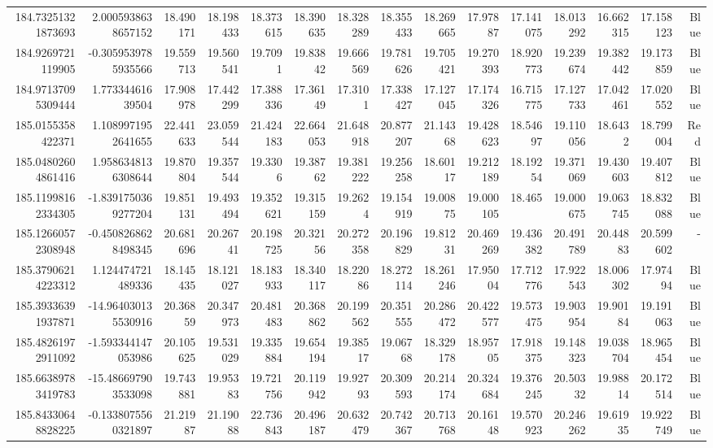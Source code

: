 \begin{center}
\begin{longtable}{rrrrrrrrrrrrrrr}
184.73251321873693 & 2.0005938638657152 & 18.490171 & 18.198433 & 18.373615 & 18.390635 & 18.328289 & 18.355433 & 18.269665 & 17.97887 & 17.141075 & 18.013292 & 16.662315 & 17.158123 & Blue \\
184.9269721119905 & -0.3059539785935566 & 19.559713 & 19.560541 & 19.7091 & 19.83842 & 19.666569 & 19.781626 & 19.705421 & 19.270393 & 18.920773 & 19.239674 & 19.382442 & 19.173859 & Blue \\
184.97137095309444 & 1.77334461639504 & 17.908978 & 17.442299 & 17.388336 & 17.36149 & 17.3101 & 17.338427 & 17.127045 & 17.174326 & 16.715775 & 17.127733 & 17.042461 & 17.020552 & Blue \\
185.0155358422371 & 1.1089971952641655 & 22.441633 & 23.059544 & 21.424183 & 22.664053 & 21.648918 & 20.877207 & 21.14368 & 19.428623 & 18.54697 & 19.110056 & 18.6432 & 18.799004 & Red \\
185.04802604861416 & 1.9586348136308644 & 19.870804 & 19.357544 & 19.3306 & 19.38762 & 19.381222 & 19.256258 & 18.60117 & 19.212189 & 18.19254 & 19.371069 & 19.430603 & 19.407812 & Blue \\
185.11998162334305 & -1.8391750369277204 & 19.851131 & 19.493494 & 19.352621 & 19.315159 & 19.2624 & 19.154919 & 19.00875 & 19.000105 & 18.465 & 19.000675 & 19.063745 & 18.832088 & Blue \\
185.12660572308948 & -0.4508268628498345 & 20.681696 & 20.26741 & 20.198725 & 20.32156 & 20.272358 & 20.196829 & 19.81231 & 20.469269 & 19.436382 & 20.491789 & 20.44883 & 20.599602 & - \\
185.37906214223312 & 1.124474721489336 & 18.145435 & 18.121027 & 18.183933 & 18.340117 & 18.22086 & 18.272114 & 18.261246 & 17.95004 & 17.712776 & 17.922543 & 18.006302 & 17.97494 & Blue \\
185.39336391937871 & -14.964030135530916 & 20.36859 & 20.347973 & 20.481483 & 20.368862 & 20.199562 & 20.351555 & 20.286472 & 20.422577 & 19.573475 & 19.903954 & 19.90184 & 19.191063 & Blue \\
185.48261972911092 & -1.593344147053986 & 20.105625 & 19.531029 & 19.335884 & 19.654194 & 19.38517 & 19.06768 & 18.329178 & 18.95705 & 17.918375 & 19.148323 & 19.038704 & 18.965454 & Blue \\
185.66389783419783 & -15.486697903533098 & 19.743881 & 19.95383 & 19.721756 & 20.119942 & 19.92793 & 20.309593 & 20.214174 & 20.324684 & 19.376245 & 20.50332 & 19.98814 & 20.172514 & Blue \\
185.84330648828225 & -0.1338075560321897 & 21.21987 & 21.19088 & 22.736843 & 20.496187 & 20.632479 & 20.742367 & 20.713768 & 20.16148 & 19.570923 & 20.246262 & 19.61935 & 19.922749 & Blue \\

\end{longtable}
\end{center}
